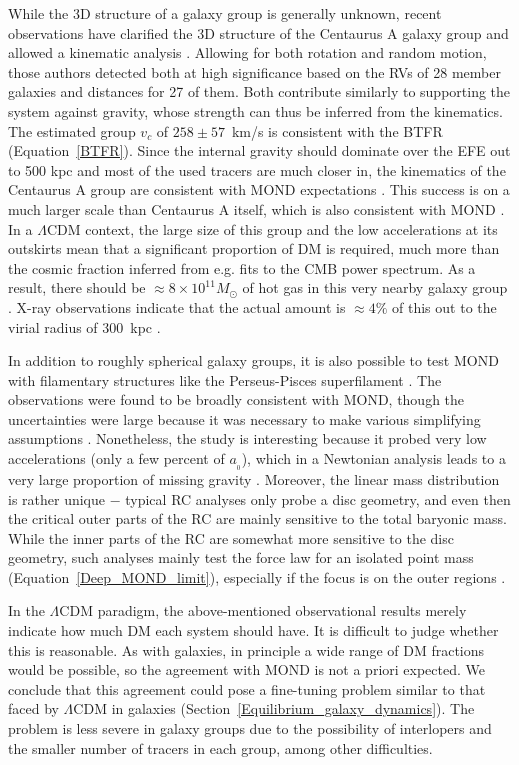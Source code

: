 \documentclass[fleqn,usenatbib,useAMS]{mnras} %
\begin{document}
While the 3D structure of a galaxy group is generally unknown, recent observations have clarified the 3D structure of the Centaurus A galaxy group and allowed a kinematic analysis \citep{Muller_2022}. Allowing for both rotation and random motion, those authors detected both at high significance based on the RVs of 28 member galaxies and distances for 27 of them. Both contribute similarly to supporting the system against gravity, whose strength can thus be inferred from the kinematics. The estimated group $v_c$ of $258 \pm 57$~km/s is consistent with the BTFR (Equation~\ref{BTFR}). Since the internal gravity should dominate over the EFE out to 500 kpc \citep{Oria_2021} and most of the used tracers are much closer in, the kinematics of the Centaurus A group are consistent with MOND expectations \citep{Muller_2022}. This success is on a much larger scale than Centaurus A itself, which is also consistent with MOND \citep{Samurovic_2016_Cen_A}. In a $\Lambda$CDM context, the large size of this group and the low accelerations at its outskirts mean that a significant proportion of DM is required, much more than the cosmic fraction inferred from e.g. fits to the CMB power spectrum. As a result, there should be $\approx 8 \times 10^{11} M_\odot$ of hot gas in this very nearby galaxy group \citep{Muller_2022}. X-ray observations indicate that the actual amount is $\approx 4\%$ of this out to the virial radius of 300~kpc \citep{Gaspari_2019}.

In addition to roughly spherical galaxy groups, it is also possible to test MOND with filamentary structures like the Perseus-Pisces superfilament \citep{Haynes_1986}. The observations were found to be broadly consistent with MOND, though the uncertainties were large because it was necessary to make various simplifying assumptions \citep{Milgrom_1997}. Nonetheless, the study is interesting because it probed very low accelerations (only a few percent of $a_{_0}$), which in a Newtonian analysis leads to a very large proportion of missing gravity \citep{Eisenstein_1997}. Moreover, the linear mass distribution is rather unique $-$ typical RC analyses only probe a disc geometry, and even then the critical outer parts of the RC are mainly sensitive to the total baryonic mass. While the inner parts of the RC are somewhat more sensitive to the disc geometry, such analyses mainly test the force law for an isolated point mass (Equation~\ref{Deep_MOND_limit}), especially if the focus is on the outer regions \citep[e.g.][]{Lelli_2019}.

In the $\Lambda$CDM paradigm, the above-mentioned observational results merely indicate how much DM each system should have. It is difficult to judge whether this is reasonable. As with galaxies, in principle a wide range of DM fractions would be possible, so the agreement with MOND is not a priori expected. We conclude that this agreement could pose a fine-tuning problem similar to that faced by $\Lambda$CDM in galaxies (Section~\ref{Equilibrium_galaxy_dynamics}). The problem is less severe in galaxy groups due to the possibility of interlopers and the smaller number of tracers in each group, among other difficulties.
\end{document}
